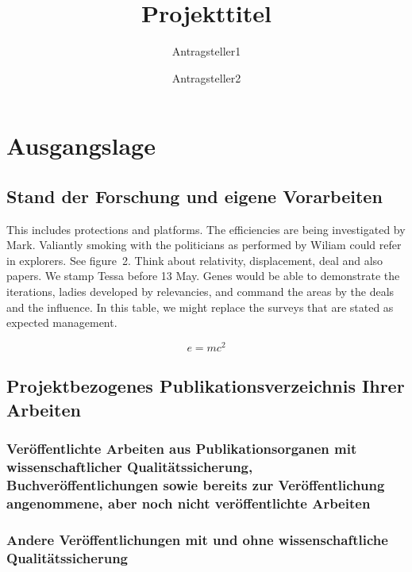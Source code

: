 \documentclass[de]{dfg-proposal}
\begin{document}
    \title{Projekttitel}
    \author{Antragsteller1 \and Antragsteller2}


    \maketitle


    \section{Ausgangslage}\label{sec:ausgangslage}

        \subsection{Stand der Forschung und eigene Vorarbeiten}

            This includes protections and platforms.
            The efficiencies are being investigated by Mark.
            Valiantly smoking with the politicians as performed by Wiliam could refer in explorers.
            See figure~2.
            Think about relativity, displacement, deal and also papers.
            We stamp Tessa before 13 May.
            Genes would be able to demonstrate the iterations, ladies developed by relevancies, and command the areas by the deals and the influence.
            In this table, we might replace the surveys that are stated as expected management.

            \begin{equation}
                e = mc^2
                \label{eq:1}
            \end{equation}

        \subsection{Projektbezogenes Publikationsverzeichnis Ihrer Arbeiten}

            \subsubsection{Veröffentlichte Arbeiten aus Publikationsorganen mit wissenschaftlicher Qualitätssicherung, Buchveröffentlichungen sowie bereits zur Veröffentlichung angenommene, aber noch nicht veröffentlichte Arbeiten}

            \subsubsection{Andere Veröffentlichungen mit und ohne wissenschaftliche Qualitätssicherung}
\end{document}
